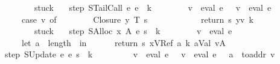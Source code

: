 \begin{isabellebody}
\ \ \ \ \ \ {\isacharbar}\ {\isacharunderscore}\ {\isasymRightarrow}\ stuck{\isacharparenright}{\isachardoublequoteclose}\ {\isacharbar}\isanewline
\ \ {\isachardoublequoteopen}step\ {\isacharparenleft}STailCall\ e{}\ e{}{\isacharcomma}\ {\isasymrho}{\isacharcomma}\ k{\isacharcomma}\ {\isasymmu}{\isacharcomma}\ {\isacharbrackleft}{\isacharbrackright}{\isacharparenright}\ {\isacharequal}\isanewline
\ \ \ \ \ {\isacharparenleft}v{}\ {\isacharcolon}{\isacharequal}\ eval\ e{}\ {\isasymrho}\ {\isasymmu}{\isacharsemicolon}\ v{}\ {\isacharcolon}{\isacharequal}\ eval\ e{}\ {\isasymrho}\ {\isasymmu}{\isacharsemicolon}\isanewline
\ \ \ \ \ \ case\ v{}\ of\isanewline
\ \ \ \ \ \ \ \ Closure\ y\ T\ s{\isacharprime}\ {\isasymrho}{\isacharprime}\ {\isasymRightarrow}\isanewline
\ \ \ \ \ \ \ \ \ \ return\ {\isacharparenleft}s{\isacharprime}{\isacharcomma}\ {\isacharparenleft}y{\isacharcomma}v{}{\isacharparenright}{\isacharhash}{\isasymrho}{\isacharprime}{\isacharcomma}\ k{\isacharcomma}\ {\isasymmu}{\isacharcomma}\ {\isacharbrackleft}{\isacharbrackright}{\isacharparenright}\isanewline
\ \ \ \ \ \ {\isacharbar}\ {\isacharunderscore}\ {\isasymRightarrow}\ stuck{\isacharparenright}{\isachardoublequoteclose}\ {\isacharbar}\isanewline
\ \ {\isachardoublequoteopen}step\ {\isacharparenleft}SAlloc\ x\ A\ e\ s{\isacharcomma}\ {\isasymrho}{\isacharcomma}\ k{\isacharcomma}\ {\isasymmu}{\isacharcomma}\ {\isacharbrackleft}{\isacharbrackright}{\isacharparenright}\ {\isacharequal}\isanewline
\ \ \ \ \ {\isacharparenleft}v\ {\isacharcolon}{\isacharequal}\ eval\ e\ {\isasymrho}\ {\isasymmu}{\isacharsemicolon}\isanewline
\ \ \ \ \ \ let\ a\ {\isacharequal}\ length\ {\isasymmu}\ in\isanewline
\ \ \ \ \ \ return\ {\isacharparenleft}s{\isacharcomma}\ {\isacharparenleft}x{\isacharcomma}VRef\ a{\isacharparenright}{\isacharhash}{\isasymrho}{\isacharcomma}\ k{\isacharcomma}\ {\isacharparenleft}a{\isacharcomma}{\isacharparenleft}Val\ v{\isacharcomma}A{\isacharparenright}{\isacharparenright}{\isacharhash}{\isasymmu}{\isacharcomma}\ {\isacharbrackleft}{\isacharbrackright}{\isacharparenright}{\isacharparenright}{\isachardoublequoteclose}\ {\isacharbar}\isanewline
\ \ {\isachardoublequoteopen}step\ {\isacharparenleft}SUpdate\ e{}\ e{}\ s{\isacharcomma}\ {\isasymrho}{\isacharcomma}\ k{\isacharcomma}\ {\isasymmu}{\isacharcomma}\ {\isacharbrackleft}{\isacharbrackright}{\isacharparenright}\ {\isacharequal}\isanewline
\ \ \ \ \ \ {\isacharparenleft}v{}\ {\isacharcolon}{\isacharequal}\ eval\ e{}\ {\isasymrho}\ {\isasymmu}{\isacharsemicolon}\ v{}\ {\isacharcolon}{\isacharequal}\ eval\ e{}\ {\isasymrho}\ {\isasymmu}{\isacharsemicolon}\ a\ {\isacharcolon}{\isacharequal}\ to{\isacharunderscore}addr\ v{}{\isacharsemicolon}\isanewline

\end{isabellebody}
